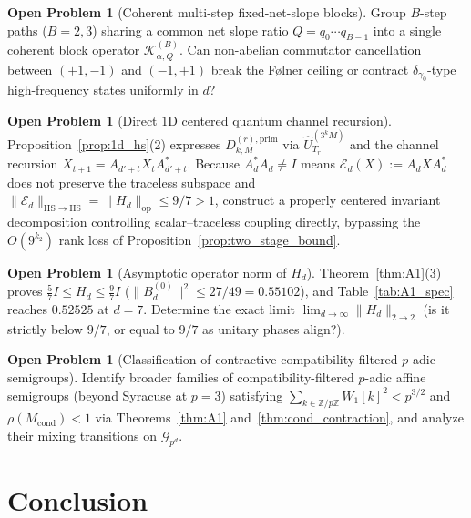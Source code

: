 \documentclass[11pt,a4paper]{article}
\numberwithin{equation}{section}
\theoremstyle{definition}
\newtheorem{problem}[theorem]{Open Problem}
\theoremstyle{remark}
\newcommand{\Z}{\mathbb{Z}}
\newcommand{\cG}{\mathcal{G}}
\newcommand{\cK}{\mathcal{K}}
\newcommand{\prim}{\mathrm{prim}}
\newcommand{\op}{\mathrm{op}}
\newcommand{\HS}{\mathrm{HS}}
\begin{document}
\begin{problem}[Coherent multi-step fixed-net-slope blocks]
Group $B$-step paths ($B = 2, 3$) sharing a common net slope ratio $Q = q_0 \cdots q_{B-1}$ into a single coherent block operator $\cK_{\alpha, Q}^{(B)}$. Can non-abelian commutator cancellation between $(+1, -1)$ and $(-1, +1)$ break the F{\o}lner ceiling or contract $\delta_{\gamma_0}$-type high-frequency states uniformly in $d$?
\end{problem}

\begin{problem}[Direct $1$D centered quantum channel recursion]
Proposition~\ref{prop:1d_hs}(2) expresses $D_{k, M}^{(r), \prim}$ via $\widehat{U}_{T_r}^{(3^k M)}$ and the channel recursion $X_{t+1} = A_{d'+t} X_t A_{d'+t}^*$. Because $A_d^* A_d \neq I$ means $\mathcal{E}_d(X) := A_d X A_d^*$ does not preserve the traceless subspace and $\|\mathcal{E}_d\|_{\HS\to\HS} = \|H_d\|_{\op} \le 9/7 > 1$, construct a properly centered invariant decomposition controlling scalar--traceless coupling directly, bypassing the $O(9^{k_2})$ rank loss of Proposition~\ref{prop:two_stage_bound}.
\end{problem}

\begin{problem}[Asymptotic operator norm of $H_d$]
Theorem~\ref{thm:A1}(3) proves $\frac{5}{7} I \le H_d \le \frac{9}{7} I$ ($\|B_d^{(0)}\|^2 \le 27/49 = 0.55102$), and Table~\ref{tab:A1_spec} reaches $0.52525$ at $d = 7$. Determine the exact limit $\lim_{d\to\infty} \|H_d\|_{2\to 2}$ (is it strictly below $9/7$, or equal to $9/7$ as unitary phases align?).
\end{problem}

\begin{problem}[Classification of contractive compatibility-filtered $p$-adic semigroups]
Identify broader families of compatibility-filtered $p$-adic affine semigroups (beyond Syracuse at $p=3$) satisfying $\sum_{k\in\Z/p\Z} W_1[k]^2 < p^{3/2}$ and $\rho(M_{\mathrm{cond}}) < 1$ via Theorems~\ref{thm:A1} and~\ref{thm:cond_contraction}, and analyze their mixing transitions on $\cG_{p^d}$.
\end{problem}

\section{Conclusion}\label{sec:conclusion}
\end{document}
